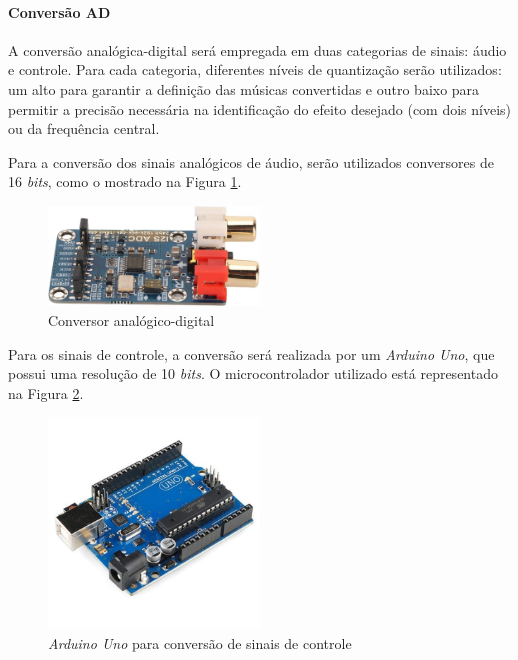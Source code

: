 \paragraph{Conversão AD}

A conversão analógica-digital será empregada em duas categorias de sinais: áudio e controle. Para cada categoria, diferentes níveis de quantização serão utilizados: um alto para garantir a definição das músicas convertidas e outro baixo para permitir a precisão necessária na identificação do efeito desejado (com dois níveis) ou da frequência central.

Para a conversão dos sinais analógicos de áudio, serão utilizados conversores de 16 \textit{bits}, como o mostrado na Figura \ref{fig63}.

\begin{figure}[h]
    \centering
    \includegraphics[width=0.5\textwidth]{figuras/fig63.jpg}
    \caption{Conversor analógico-digital \cite{walmartRobotHuman}}
    \label{fig63}
\end{figure}

Para os sinais de controle, a conversão será realizada por um \textit{Arduino Uno}, que possui uma resolução de 10 \textit{bits}. O microcontrolador utilizado está representado na Figura \ref{fig64}.

\begin{figure}[h]
    \centering
    \includegraphics[width=0.5\textwidth]{figuras/fig64.jpeg}
    \caption{\textit{Arduino Uno} para conversão de sinais de controle \cite{vidadesilicioPlacaCabo}}
    \label{fig64}
\end{figure}

